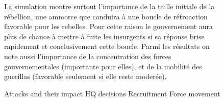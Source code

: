 \documentclass{article}
\begin{document}
\begin{center}
\begin{figure}[H]
\hfill
\begin{minipage}[H]{0.6\linewidth}
La simulation montre surtout l'importance de la taille initiale de la rébellion, une ammorce que conduira à une boucle de rétroaction favorable pour les rebelles. Pour cette raison le gouvernement aura plus de chance à mettre à fuite les insurgents si sa réponse brise rapidement et conclusivement cette boucle. Parmi les résultats on note aussi l'importance de la concentration des forces gouvernementales (importante pour elles), et de la mobilité des guerillas (favorable seulement si elle reste moderée).
\end{minipage}
\hfill
\begin{minipage}[H]{0.3\linewidth}
\begin{algorithmic}[1]
			\STATE Attacks and their impact
			\STATE HQ decisions
			\STATE Recruitment
			\STATE Force movement
		\ENDWHILE
		\end{algorithmic}
\cite{doran2005iruba}
\end{minipage}
\hfill
\end{figure}
\end{center}
\end{document}
